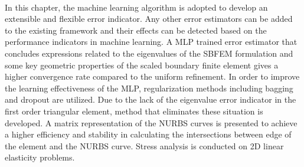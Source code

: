 \paragraph{}
In this chapter, the machine learning algorithm is adopted to develop an extensible and flexible error indicator.
Any other error estimators can be added to the existing framework and their effects can be detected based on the performance indicators in machine learning.
A MLP trained error estimator that concludes expressions related to the eigenvalues of the SBFEM formulation and some key geometric properties of the scaled boundary finite element gives a higher convergence rate compared to the uniform refinement.
In order to improve the learning effectiveness of the MLP, regularization methods including bagging and dropout are utilized.
Due to the lack of the eigenvalue error indicator in the first order triangular element, method that eliminates these situation is developed.
A matrix representation of the NURBS curves is presented to achieve a higher efficiency and stability in calculating the intersections between edge of the element and the NURBS curve.
Stress analysis is conducted on 2D linear elasticity problems.